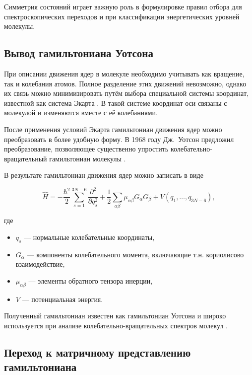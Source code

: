 Симметрия состояний играет важную роль
в формулировке правил отбора для спектроскопических переходов
и при классификации энергетических уровней молекулы.

\subsection{Вывод гамильтониана Уотсона}

При описании движения ядер в молекуле
необходимо учитывать как вращение,
так и колебания атомов.
Полное разделение этих движений невозможно,
однако их связь можно минимизировать
путём выбора специальной системы координат,
известной как система Экарта \cite{Eckart1935,BunkerJensen1998}.
В такой системе координат оси связаны с молекулой
и изменяются вместе с её колебаниями.

После применения условий Экарта
гамильтониан движения ядер можно преобразовать
в более удобную форму.
В 1968 году Дж.~Уотсон предложил преобразование,
позволяющее существенно упростить
колебательно-вращательный гамильтониан молекулы
\cite{Watson1968}.

В результате гамильтониан движения ядер
можно записать в виде

\begin{equation}
\hat{H} =
-\frac{\hbar^2}{2}\sum_{s=1}^{3N-6}
\frac{\partial^2}{\partial q_s^2}
+
\frac{1}{2}
\sum_{\alpha\beta}
\mu_{\alpha\beta}
G_{\alpha}
G_{\beta}
+V(q_1,\ldots,q_{3N-6}),
\end{equation}

где

\begin{itemize}
\item $q_s$ — нормальные колебательные координаты,
\item $G_{\alpha}$ — компоненты колебательного момента, включающие т.н. кориолисово взаимодействие,
\item $\mu_{\alpha\beta}$ — элементы обратного тензора инерции,
\item $V$ — потенциальная энергия.
\end{itemize}

Полученный гамильтониан известен как гамильтониан Уотсона
и широко используется при анализе
колебательно-вращательных спектров молекул
\cite{Watson1968,Watson1977}.

\subsection{Переход к матричному представлению гамильтониана}

